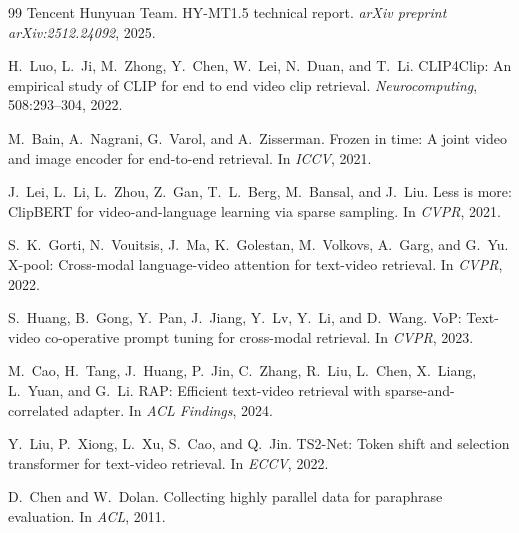 \documentclass[10pt,a4paper]{ctexart}
\begin{document}
\begin{thebibliography}{99}
Tencent Hunyuan Team.
\newblock HY-MT1.5 technical report.
\newblock \textit{arXiv preprint arXiv:2512.24092}, 2025.

H.~Luo, L.~Ji, M.~Zhong, Y.~Chen, W.~Lei, N.~Duan, and T.~Li.
\newblock CLIP4Clip: An empirical study of CLIP for end to end video clip retrieval.
\newblock \textit{Neurocomputing}, 508:293--304, 2022.

M.~Bain, A.~Nagrani, G.~Varol, and A.~Zisserman.
\newblock Frozen in time: A joint video and image encoder for end-to-end retrieval.
\newblock In \textit{ICCV}, 2021.

J.~Lei, L.~Li, L.~Zhou, Z.~Gan, T.~L.~Berg, M.~Bansal, and J.~Liu.
\newblock Less is more: ClipBERT for video-and-language learning via sparse sampling.
\newblock In \textit{CVPR}, 2021.

S.~K.~Gorti, N.~Vouitsis, J.~Ma, K.~Golestan, M.~Volkovs, A.~Garg, and G.~Yu.
\newblock X-pool: Cross-modal language-video attention for text-video retrieval.
\newblock In \textit{CVPR}, 2022.

S.~Huang, B.~Gong, Y.~Pan, J.~Jiang, Y.~Lv, Y.~Li, and D.~Wang.
\newblock VoP: Text-video co-operative prompt tuning for cross-modal retrieval.
\newblock In \textit{CVPR}, 2023.

M.~Cao, H.~Tang, J.~Huang, P.~Jin, C.~Zhang, R.~Liu, L.~Chen, X.~Liang, L.~Yuan, and G.~Li.
\newblock RAP: Efficient text-video retrieval with sparse-and-correlated adapter.
\newblock In \textit{ACL Findings}, 2024.

Y.~Liu, P.~Xiong, L.~Xu, S.~Cao, and Q.~Jin.
\newblock TS2-Net: Token shift and selection transformer for text-video retrieval.
\newblock In \textit{ECCV}, 2022.

D.~Chen and W.~Dolan.
\newblock Collecting highly parallel data for paraphrase evaluation.
\newblock In \textit{ACL}, 2011.


\end{thebibliography}
\end{document}

